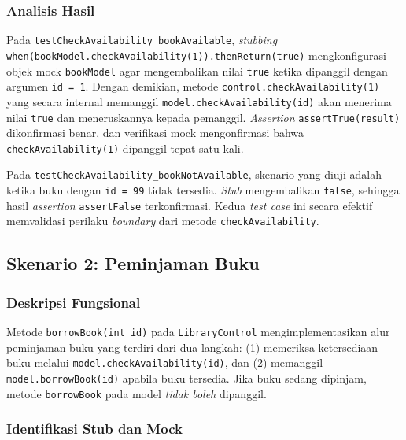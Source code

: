 \documentclass[12pt,a4paper]{article}
\begin{document}
\subsubsection{Analisis Hasil}

Pada \texttt{testCheckAvailability\_bookAvailable}, \textit{stubbing}
\texttt{when(bookModel.checkAvailability(1)).thenReturn(true)} mengkonfigurasi
objek mock \texttt{bookModel} agar mengembalikan nilai \texttt{true} ketika
dipanggil dengan argumen \texttt{id = 1}. Dengan demikian, metode
\texttt{control.checkAvailability(1)} yang secara internal memanggil
\texttt{model.checkAvailability(id)} akan menerima nilai \texttt{true} dan
meneruskannya kepada pemanggil. \textit{Assertion} \texttt{assertTrue(result)}
dikonfirmasi benar, dan verifikasi mock mengonfirmasi bahwa
\texttt{checkAvailability(1)} dipanggil tepat satu kali.

Pada \texttt{testCheckAvailability\_bookNotAvailable}, skenario yang diuji
adalah ketika buku dengan \texttt{id = 99} tidak tersedia. \textit{Stub}
mengembalikan \texttt{false}, sehingga hasil \textit{assertion}
\texttt{assertFalse} terkonfirmasi. Kedua \textit{test case} ini secara efektif
memvalidasi perilaku \textit{boundary} dari metode \texttt{checkAvailability}.

\subsection{Skenario 2: Peminjaman Buku}

\subsubsection{Deskripsi Fungsional}

Metode \texttt{borrowBook(int id)} pada \texttt{LibraryControl} mengimplementasikan
alur peminjaman buku yang terdiri dari dua langkah: (1) memeriksa ketersediaan
buku melalui \texttt{model.checkAvailability(id)}, dan (2) memanggil
\texttt{model.borrowBook(id)} apabila buku tersedia. Jika buku sedang dipinjam,
metode \texttt{borrowBook} pada model \emph{tidak boleh} dipanggil.

\subsubsection{Identifikasi Stub dan Mock}
\end{document}
